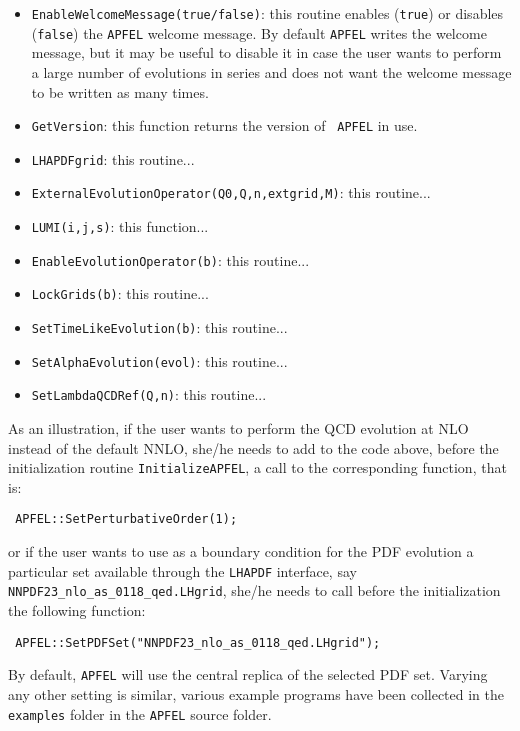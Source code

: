 \documentclass[11pt,a4paper]{article}
\begin{document}
\begin{itemize}
\item{\tt EnableWelcomeMessage(true/false)}: this routine enables
  ({\tt true}) or disables ({\tt false}) the {\tt APFEL} welcome
  message. By default {\tt APFEL} writes the welcome message, but it
  may be useful to disable it in case the user wants to perform a
  large number of evolutions in series and does not want the welcome
  message to be written as many times.

\item{\tt GetVersion}: this function returns the version of {\tt
    APFEL} in use.

\item{\tt LHAPDFgrid}: this routine...

\item{\tt ExternalEvolutionOperator(Q0,Q,n,extgrid,M)}: this routine...

\item{\tt LUMI(i,j,s)}: this function...

\item{\tt EnableEvolutionOperator(b)}: this routine...

\item{\tt LockGrids(b)}: this routine...

\item{\tt SetTimeLikeEvolution(b)}: this routine...

\item{\tt SetAlphaEvolution(evol)}: this routine...

\item{\tt SetLambdaQCDRef(Q,n)}: this routine...

\end{itemize}

As an illustration, if the user wants to perform the QCD evolution at NLO
instead of  the default NNLO, she/he needs to add to the code above,
before the initialization routine {\tt InitializeAPFEL}, a call to the
corresponding function, that is:
\begin{lstlisting}
 APFEL::SetPerturbativeOrder(1);
\end{lstlisting}
or if the user wants to use as a boundary condition for the PDF
evolution a particular set available through the {\tt LHAPDF} interface, say
{\tt NNPDF23\_nlo\_as\_0118\_qed.LHgrid}, she/he needs
to call before the initialization the following function:
\begin{lstlisting}
 APFEL::SetPDFSet("NNPDF23_nlo_as_0118_qed.LHgrid");
\end{lstlisting}
By default, {\tt APFEL} will use the central replica of
the selected PDF set. 
%
Varying any other setting is similar, various example programs
have been collected in the {\tt examples} folder in the {\tt APFEL} source
folder.
%
\end{document}
